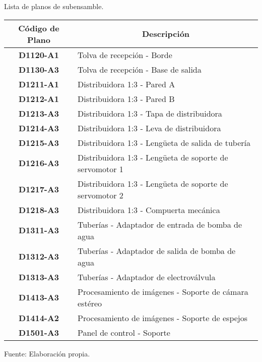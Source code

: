 \begin{mytable}[H]
	\footnotesize\centering
	\caption{Lista de planos de subensamble.}
	\label{tab:lista de planos de subensamble}
	\begin{tabular}{|c|l|}
		\hline
		\multicolumn{1}{|c|}{\textbf{Código de Plano}} & \multicolumn{1}{c|}{\textbf{Descripción}} \\ \hline
		\textbf{D1120-A1}         & Tolva de recepción - Borde \\ \hline
		\textbf{D1130-A3}         & Tolva de recepción - Base de salida \\ \hline
		\textbf{D1211-A1}         & Distribuidora 1:3 - Pared A \\ \hline
		\textbf{D1212-A1}         & Distribuidora 1:3 - Pared B \\ \hline
		\textbf{D1213-A3}         & Distribuidora 1:3 - Tapa de distribuidora \\ \hline
		\textbf{D1214-A3}         & Distribuidora 1:3 - Leva de distribuidora \\ \hline
		\textbf{D1215-A3}         & Distribuidora 1:3 - Lengüeta de salida de tubería \\ \hline
		\textbf{D1216-A3}         & Distribuidora 1:3 - Lengüeta de soporte de servomotor 1 \\ \hline
		\textbf{D1217-A3}         & Distribuidora 1:3 - Lengüeta de soporte de servomotor 2 \\ \hline 
		\textbf{D1218-A3}         & Distribuidora 1:3 - Compuerta mecánica \\ \hline 
		\textbf{D1311-A3}         & Tuberías - Adaptador de entrada de bomba de agua \\ \hline 
		\textbf{D1312-A3}         & Tuberías - Adaptador de salida de bomba de agua \\ \hline 
		\textbf{D1313-A3}         & Tuberías - Adaptador de electroválvula\\ \hline
		\textbf{D1413-A3}         & Procesamiento de imágenes - Soporte de cámara estéreo \\ \hline
		\textbf{D1414-A2}         & Procesamiento de imágenes - Soporte de espejos \\ \hline
		\textbf{D1501-A3}         & Panel de control - Soporte \\ \hline
	\end{tabular}
	\begin{myflushcenteraftertable}	
		Fuente: Elaboración propia.
	\end{myflushcenteraftertable}
\end{mytable}

